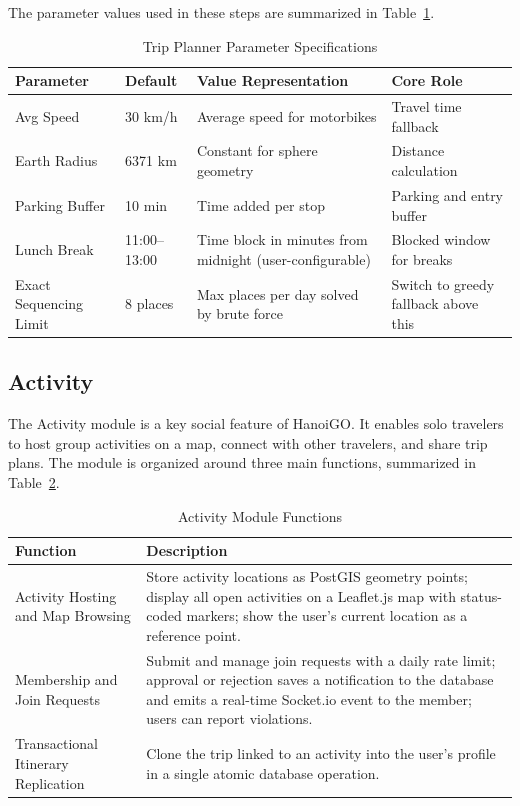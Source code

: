 \documentclass[a4paper,12pt]{report}
\begin{document}
The parameter values used in these steps are summarized in Table~\ref{tab:trip_parameters}.

\begin{table}[h!]
\centering
\caption{Trip Planner Parameter Specifications}
\label{tab:trip_parameters}
\renewcommand{\arraystretch}{1.3}
\begin{tabular}{|p{2.8cm}|p{2.5cm}|p{5.5cm}|p{3.7cm}|}
\hline
\textbf{Parameter} & \textbf{Default} & \textbf{Value Representation} & \textbf{Core Role} \\ \hline
Avg Speed & 30 km/h & Average speed for motorbikes & Travel time fallback \\ \hline
Earth Radius & 6371 km & Constant for sphere geometry & Distance calculation \\ \hline
Parking Buffer & 10 min & Time added per stop & Parking and entry buffer \\ \hline
Lunch Break & 11:00--13:00 & Time block in minutes from midnight (user-configurable) & Blocked window for breaks \\ \hline
Exact Sequencing Limit & 8 places & Max places per day solved by brute force & Switch to greedy fallback above this \\ \hline
\end{tabular}
\end{table}

\subsection{Activity}

The Activity module is a key social feature of HanoiGO. It enables solo travelers to host group activities on a map, connect with other travelers, and share trip plans. The module is organized around three main functions, summarized in Table~\ref{tab:activity_functions}.

\begin{table}[H]
\centering
\small
\renewcommand{\arraystretch}{1.2}
\begin{tabular}{|>{\raggedright\arraybackslash}p{4cm}|>{\raggedright\arraybackslash}p{9.5cm}|}
\hline
\textbf{Function} & \textbf{Description} \\ \hline
Activity Hosting and Map Browsing & Store activity locations as PostGIS geometry points; display all open activities on a Leaflet.js map with status-coded markers; show the user's current location as a reference point. \\ \hline
Membership and Join Requests & Submit and manage join requests with a daily rate limit; approval or rejection saves a notification to the database and emits a real-time Socket.io event to the member; users can report violations. \\ \hline
Transactional Itinerary Replication & Clone the trip linked to an activity into the user's profile in a single atomic database operation. \\ \hline
\end{tabular}
\caption{Activity Module Functions}
\label{tab:activity_functions}
\end{table}
\end{document}
